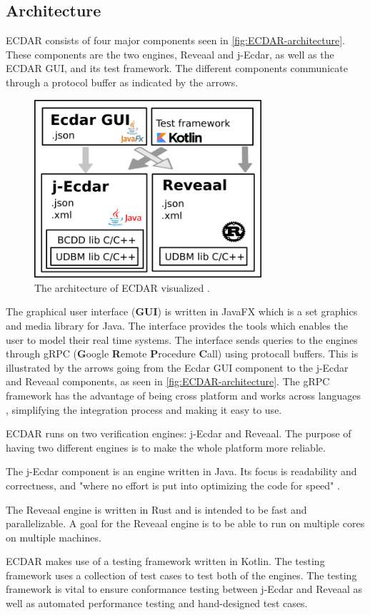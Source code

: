\subsection{Architecture}\label{sub:architecture}
ECDAR consists of four major components seen in \autoref{fig:ECDAR-architecture}.
These components are the two engines, Reveaal and j-Ecdar, as well as the ECDAR GUI, and its test framework. 
The different components communicate through a protocol buffer as indicated by the arrows.
\begin{figure}[H]
    \centering
    \includegraphics[width=0.75\textwidth]{common/figures/ArchOverview.png}
    \caption{The architecture of ECDAR visualized \cite{ECDARNET}.}
    \label{fig:ECDAR-architecture}
\end{figure}

The graphical user interface (\textbf{GUI}) is written in JavaFX which is a set graphics and media library for Java. The interface provides the tools which enables the user to model their real time systems. The interface sends queries to the engines through gRPC (\textbf{G}oogle \textbf{R}emote \textbf{P}rocedure \textbf{C}all) using protocall buffers. 
This is illustrated by the arrows going from the Ecdar GUI component to the j-Ecdar and Reveaal components, as seen in \autoref{fig:ECDAR-architecture}. 
The gRPC framework has the advantage of being cross platform and works across languages \cite{gRPC}, simplifying the integration process and making it easy to use.

ECDAR runs on two verification engines: j-Ecdar and Reveaal. 
The purpose of having two different engines is to make the whole platform more reliable.

The j-Ecdar component is an engine written in Java.
Its focus is readability and correctness, and "where no effort is put into optimizing the code for speed" \cite{ECDARNET}.

The Reveaal engine is written in Rust and is intended to be fast and parallelizable. 
A goal for the Reveaal engine is to be able to run on multiple cores on multiple machines. 

ECDAR makes use of a testing framework written in Kotlin. 
The testing framework uses a collection of test cases to test both of the engines. 
The testing framework is vital to ensure conformance testing between j-Ecdar and Reveaal as well as automated performance testing and hand-designed test cases. 